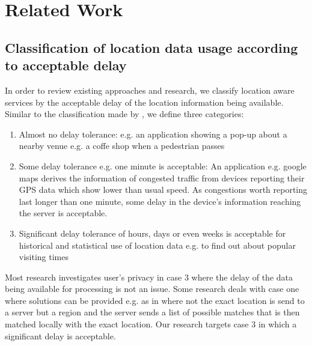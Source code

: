 \chapter{Related Work}\label{chapter:related-work}

\section{Classification of location data usage according to acceptable delay}
In order to review existing approaches and research, we classify location aware services by the acceptable delay of the location information being available. Similar to the classification made by \parencite{hoh2005protecting}, we define three categories:
\begin{enumerate}
  \item Almost no delay tolerance: e.g. an application showing a pop-up about a nearby venue e.g. a coffe shop when a pedestrian passes
  \item Some delay tolerance e.g. one minute is acceptable: An application e.g. google maps derives the information of congested traffic from devices reporting their GPS data which show lower than usual speed. As congestions worth reporting last longer than one minute, some delay in the device's information reaching the server is acceptable.
  \item Significant delay tolerance of hours, days or even weeks is acceptable for historical and statistical use of location data e.g. to find out about popular visiting times
\end{enumerate}
Most research investigates user's privacy in case 3 \parencite{krumm, cellphone, privacy-home-work-pairs, twitter} where the delay of the data being available for processing is not an issue. Some research deals with case one \parencite{location-privacy, mix-zones} where solutions can be provided e.g. as in \parencite{casper} where not the exact location is send to a server but a region and the server sends a list of possible matches that is then matched locally with the exact location.
Our research targets case 3 in which a significant delay is acceptable.


